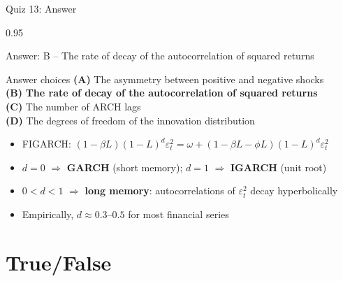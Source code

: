 \documentclass[9pt, aspectratio=169, t]{beamer}
\begin{document}
\begin{frame}{Quiz 13: Answer}
    \begin{cminipage}{0.95\textwidth}
    {\small
    \begin{exampleblock}{Answer: B -- The rate of decay of the autocorrelation of squared returns}

    \vspace{0.1cm}

    \begin{block}{Answer choices}
        \textcolor{MainBlue}{\textbf{(A)}} The asymmetry between positive and negative shocks \incorrect\\[2pt]
        \textcolor{MainBlue}{\textbf{(B)}} \textbf{\textcolor{Forest}{The rate of decay of the autocorrelation of squared returns}} \correct\\[2pt]
        \textcolor{MainBlue}{\textbf{(C)}} The number of ARCH lags \incorrect\\[2pt]
        \textcolor{MainBlue}{\textbf{(D)}} The degrees of freedom of the innovation distribution \incorrect
    \end{block}

        \vspace{0.1cm}

        \begin{itemize}\setlength{\itemsep}{0pt}
            \item FIGARCH: $(1 - \beta L)(1 - L)^d \varepsilon_t^2 = \omega + (1 - \beta L - \phi L)(1 - L)^d \varepsilon_t^2$
            \item $d = 0$ $\Rightarrow$ \textbf{GARCH} (short memory); \; $d = 1$ $\Rightarrow$ \textbf{IGARCH} (unit root)
            \item $0 < d < 1$ $\Rightarrow$ \textbf{long memory}: autocorrelations of $\varepsilon_t^2$ decay hyperbolically
            \item Empirically, $d \approx 0.3$--$0.5$ for most financial series
        \end{itemize}
    \end{exampleblock}
    }

    \end{cminipage}
\end{frame}

\section{True/False}
\end{document}
